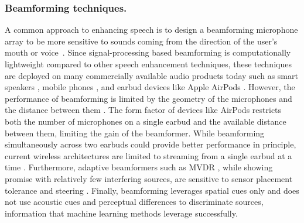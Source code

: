 \documentclass [11pt, proquest] {uwthesis}[2020/02/24]
\begin{document}
\subsubsection{Beamforming techniques.} A common approach to enhancing speech is to design a beamforming microphone array to be more sensitive to sounds coming from the direction of the user's mouth \cite{van1988beamforming} or voice~\cite{dov-uist21}. Since signal-processing based beamforming is computationally lightweight compared to other speech enhancement techniques, these techniques are deployed on many commercially available audio products today such as smart speakers \cite{amazon}, mobile phones \cite{samsungglobalnewsroom_2014}, and earbud devices like Apple AirPods \cite{airpods}. However, the performance of beamforming is limited by the geometry of the microphones and the distance between them \cite{van1988beamforming, InvenSense}. The form factor of devices like AirPods restricts both the number of microphones on a single earbud and the available distance between them, limiting the gain of the beamformer. While beamforming simultaneously across two earbuds could provide better performance in principle, current wireless architectures are limited to streaming from a single earbud at a time \cite{bluetooth}. Furthermore, adaptive beamformers such as MVDR \cite{frost1972MVDR}, while showing promise with relatively few interfering sources,  are sensitive to sensor placement tolerance and steering \cite{zhang2017deep, brandstein2001microphone}. Finally, beamforming leverages spatial cues only and does not use acoustic cues and perceptual differences to discriminate sources, information that machine learning methods leverage successfully.






\end{document}
